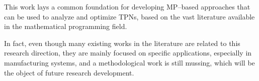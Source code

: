 \documentclass[suppldata]{interact}
\theoremstyle{plain}
\theoremstyle{definition}
\theoremstyle{remark}
\begin{document}
This work lays a common foundation for developing MP--based approaches that can be used to analyze and optimize TPNs, based on the vast literature available in the mathematical programming field. 

In fact, even though many existing works in the literature are related to this research direction, they are mainly focused on specific applications, especially in manufacturing systems, and a methodological work is still %
mussing, which will be the object of future research development. 



\end{document}

